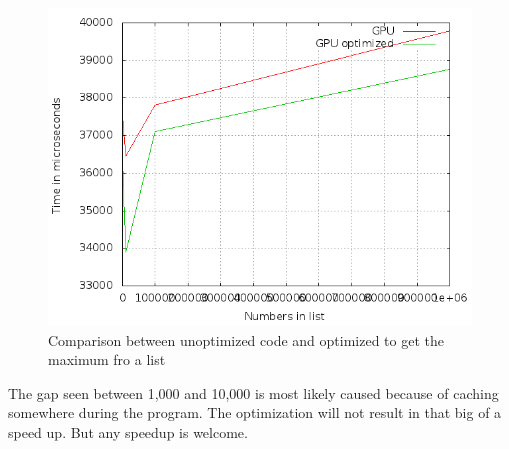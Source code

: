 \documentclass[a4paper]{article}
\begin{document}
  \begin{figure}[H]
	  \begin{center}
		  \includegraphics[scale=0.5]{6_2_2.png}
	  \end{center}
	  \caption{Comparison between unoptimized code and optimized to get the maximum fro a list}
	  \label{fig:6_2_2}
  \end{figure}
  The gap seen between 1,000 and 10,000 is most likely caused because of caching somewhere during the program.
  The optimization will not result in that big of a speed up. But any speedup is welcome.
\end{document}
